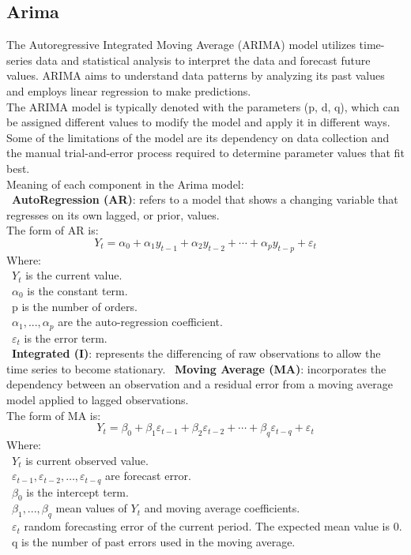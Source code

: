 \documentclass{ieeeojies}
\begin{document}
	\subsection{Arima}
	The Autoregressive Integrated Moving Average (ARIMA) \cite{b8} model utilizes time-series data and statistical analysis to interpret the data and forecast future values. ARIMA aims to understand data patterns by analyzing its past values and employs linear regression to make predictions.\\
	The ARIMA model is typically denoted with the parameters (p, d, q), which can be assigned different values to modify the model and apply it in different ways.\\
	Some of the limitations of the model are its dependency on data collection and the manual trial-and-error process required to determine parameter values that fit best. \\
	Meaning of each component in the Arima model:\\
	\indent \textbullet\ \textbf{AutoRegression (AR)}: refers to a model that shows a changing variable that regresses on its own lagged, or prior, values.\\
	The form of AR is: 
	\[Y_t=\alpha_0+\alpha_1 y_{t-1}+\alpha_2 y_{t-2}+\cdots+\alpha_p y_{t-p}+\varepsilon_t\]
	Where:\\
	\indent\textbullet\ \(Y_t\) is the current value.\\
	\indent\textbullet\ \(\alpha_0\) is the constant term.\\
	\indent\textbullet\ p is the number of orders.\\
	\indent\textbullet\ \(\alpha_1,..., \alpha_p\) are the auto-regression coefficient.\\
	\indent\textbullet\ \(\varepsilon_t\) is the error term.\\
	
	\indent \textbullet\ \textbf{Integrated (I)}: represents the differencing of raw observations to allow the time series to become stationary.
	\indent \textbullet\ \textbf{Moving Average (MA)}: incorporates the dependency between an observation and a residual error from a moving average model applied to lagged observations.\\
	The form of MA is:
	\[Y_t=\beta_0+\beta_1 \varepsilon_{t-1}+\beta_2 \varepsilon_{t-2}+\cdots+\beta_q \varepsilon_{t-q}+\varepsilon_t\]
	Where:\\
	\indent\textbullet\ \(Y_t\) is current observed value.\\
	\indent\textbullet\ \(\varepsilon_{t-1}, \varepsilon_{t-2}, \ldots, \varepsilon_{t-q}\) are forecast error.\\
	\indent\textbullet\ \(\beta_0\) is the intercept term.\\
	\indent\textbullet\ \(\beta_1,..., \beta_q\) mean values of \(Y_t\) and moving average coefficients.\\
	\indent\textbullet\ \(\varepsilon_{t}\) random forecasting error of the current period. The expected mean value is 0.\\
	\indent\textbullet\ q is the number of past errors used in the moving average.
	
\end{document}
